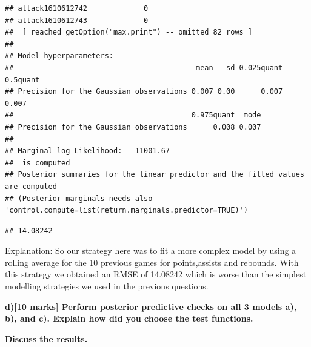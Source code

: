 \documentclass[
]{article}
\newenvironment{Shaded}{\begin{snugshade}}{\end{snugshade}}
\newcommand{\DecValTok}[1]{\textcolor[rgb]{0.00,0.00,0.81}{#1}}
\newcommand{\FunctionTok}[1]{\textcolor[rgb]{0.00,0.00,0.00}{#1}}
\newcommand{\NormalTok}[1]{#1}
\newcommand{\OtherTok}[1]{\textcolor[rgb]{0.56,0.35,0.01}{#1}}
\newcommand{\SpecialCharTok}[1]{\textcolor[rgb]{0.00,0.00,0.00}{#1}}
\begin{document}
\begin{verbatim}
## attack1610612742             0
## attack1610612743             0
##  [ reached getOption("max.print") -- omitted 82 rows ]
## 
## Model hyperparameters:
##                                          mean   sd 0.025quant 0.5quant
## Precision for the Gaussian observations 0.007 0.00      0.007    0.007
##                                         0.975quant  mode
## Precision for the Gaussian observations      0.008 0.007
## 
## Marginal log-Likelihood:  -11001.67 
##  is computed 
## Posterior summaries for the linear predictor and the fitted values are computed
## (Posterior marginals needs also 'control.compute=list(return.marginals.predictor=TRUE)')
\end{verbatim}

\begin{Shaded}
\end{Shaded}

\begin{verbatim}
## 14.08242
\end{verbatim}

Explanation: So our strategy here was to fit a more complex model by
using a rolling average for the 10 previous games for points,assists and
rebounds. With this strategy we obtained an RMSE of 14.08242 which is
worse than the simplest modelling strategies we used in the previous
questions.

\textbf{d){[}10 marks{]} Perform posterior predictive checks on all 3
models a), b), and c). Explain how did you choose the test functions.}

\textbf{Discuss the results.}
\end{document}

